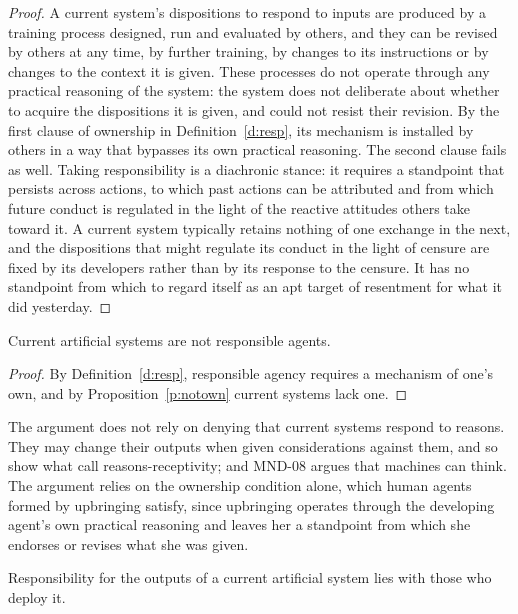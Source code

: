 \documentclass{situationist-preprint}
\begin{document}
\begin{proof}
A current system's dispositions to respond to inputs are produced by a training process designed, run and evaluated by others, and they can be revised by others at any time, by further training, by changes to its instructions or by changes to the context it is given. These processes do not operate through any practical reasoning of the system: the system does not deliberate about whether to acquire the dispositions it is given, and could not resist their revision. By the first clause of ownership in Definition~\ref{d:resp}, its mechanism is installed by others in a way that bypasses its own practical reasoning. The second clause fails as well. Taking responsibility is a diachronic stance: it requires a standpoint that persists across actions, to which past actions can be attributed and from which future conduct is regulated in the light of the reactive attitudes others take toward it. A current system typically retains nothing of one exchange in the next, and the dispositions that might regulate its conduct in the light of censure are fixed by its developers rather than by its response to the censure. It has no standpoint from which to regard itself as an apt target of resentment for what it did yesterday.
\end{proof}

\begin{theorem}\label{t:main}
Current artificial systems are not responsible agents.
\end{theorem}

\begin{proof}
By Definition~\ref{d:resp}, responsible agency requires a mechanism of one's own, and by Proposition~\ref{p:notown} current systems lack one.
\end{proof}

The argument does not rely on denying that current systems respond to reasons. They may change their outputs when given considerations against them, and so show what \citet{FischerRavizza1998} call reasons-receptivity; and MND-08 argues that machines can think. The argument relies on the ownership condition alone, which human agents formed by upbringing satisfy, since upbringing operates through the developing agent's own practical reasoning and leaves her a standpoint from which she endorses or revises what she was given.

\begin{corollary}\label{c:deploy}
Responsibility for the outputs of a current artificial system lies with those who deploy it.
\end{corollary}
\end{document}
